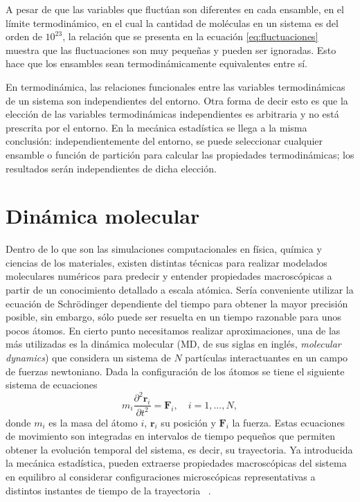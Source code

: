 
A pesar de que las variables que fluctúan son diferentes en cada ensamble, en el 
límite termodinámico, en el cual la cantidad de moléculas en un sistema es 
del orden de $10^{23}$, la relación que se presenta en la ecuación 
\ref{eq:fluctuaciones} muestra que las fluctuaciones son muy pequeñas y pueden 
ser ignoradas. Esto hace que los ensambles sean termodinámicamente equivalentes 
entre sí.

En termodinámica, las relaciones funcionales entre las variables termodinámicas 
de un sistema son independientes del entorno. Otra forma de decir esto es que la 
elección de las variables termodinámicas independientes es arbitraria y no está 
prescrita por el entorno. En la mecánica estadística se llega a la misma 
conclusión: independientemente del entorno, se puede seleccionar cualquier 
ensamble o función de partición para calcular las propiedades termodinámicas; 
los resultados serán independientes de dicha elección.


\section{Dinámica molecular}\label{md}

Dentro de lo que son las simulaciones computacionales en física, química y
ciencias de los materiales, existen distintas técnicas para realizar modelados
moleculares numéricos para predecir y entender propiedades macroscópicas a partir
de un conocimiento detallado a escala atómica. Sería conveniente utilizar la 
ecuación de Schrödinger dependiente del tiempo para obtener la mayor precisión 
posible, sin embargo, sólo puede ser resuelta en un tiempo razonable para unos 
pocos átomos. En cierto punto necesitamos realizar aproximaciones, una de las más
utilizadas es la dinámica molecular (MD, de sus siglas en inglés, 
\textit{molecular dynamics}) que considera un sistema de $N$ partículas 
interactuantes en un campo de fuerzas newtoniano. Dada la configuración de los 
átomos se tiene el siguiente sistema de ecuaciones
\begin{equation*}
m_i \frac{\partial^2 \mathbf{r}_i}{\partial t^2} = \mathbf{F}_i, \quad i = 1,..., N,
\end{equation*}
donde $m_i$ es la masa del átomo $i$, $\mathbf{r}_i$ su posición y $\mathbf{F}_i$
la fuerza. Estas ecuaciones de movimiento son integradas en intervalos de tiempo
pequeños que permiten obtener la evolución temporal del sistema, es decir, su
trayectoria. Ya introducida la mecánica estadística, pueden extraerse propiedades
macroscópicas del sistema en equilibro al considerar configuraciones microscópicas
representativas a distintos instantes de tiempo de la trayectoria
~\cite{frenkel2001, allen2017}.

